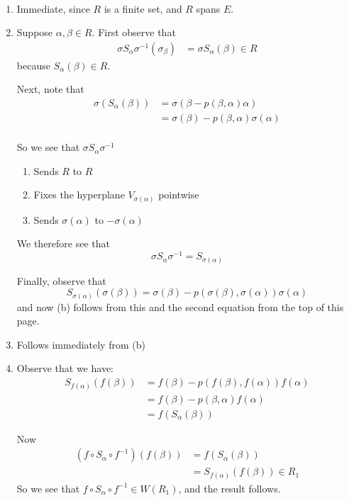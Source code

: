 \documentclass[x11names,reqno,14pt]{extarticle}
\begin{document}
\proof
\,
\begin{enumerate}[label=(\alph*)]

\item Immediate, since $R$ is a finite set, and $R$ spans $E$.

\item Suppose $\alpha,\beta\in R$. First observe that 
\begin{align*}
\sigma S_\alpha \sigma^{-1}(\sigma_\beta) & = \sigma S_\alpha(\beta) \in R
\end{align*}
because $S_\alpha(\beta)\in R$. 

Next, note that
\begin{align*}
\sigma(S_\alpha(\beta)) & = \sigma(\beta - p(\beta,\alpha)\alpha) \\ & = \sigma(\beta) - p(\beta,\alpha)\sigma(\alpha) \\
\end{align*}

So we see that $\sigma S_\alpha\sigma^{-1}$
\begin{enumerate}[label=(\roman*)]

\item Sends $R$ to $R$

\item Fixes the hyperplane $V_{\sigma(\alpha)}$ pointwise

\item Sends $\sigma(\alpha)$ to $-\sigma(\alpha)$

\end{enumerate}

We therefore see that 
\[
\sigma S_\alpha \sigma^{-1} = S_{\sigma(\alpha)}
\]

Finally, observe that 
\[
S_{\sigma(\alpha)}(\sigma(\beta)) = \sigma(\beta)-p(\sigma(\beta),\sigma(\alpha))\sigma(\alpha)
\]
and now (b) follows from this and the second equation from the top of this page. 

\item Follows immediately from (b)

\item Observe that we have:
\begin{align*}
S_{f(\alpha)}(f(\beta)) & = f(\beta) - p(f(\beta),f(\alpha))f(\alpha) \\
& = f(\beta) - p(\beta,\alpha)f(\alpha) \\
& = f(S_\alpha(\beta))
\end{align*}

Now 
\begin{align*}
(f\circ S_\alpha\circ f^{-1})(f(\beta)) & = f(S_\alpha(\beta)) \\
 & = S_{f(\alpha)}(f(\beta)) \in R_1
\end{align*}
So we see that $f\circ S_\alpha\circ f^{-1} \in W(R_1)$, and the result follows. 

\end{enumerate}
\end{document}
